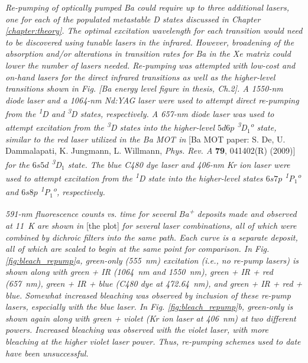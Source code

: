 \documentclass{article}
\begin{document}

\emph{Re-pumping of optically pumped Ba could require up to three additional lasers, one for each of the populated metastable D states discussed in Chapter \ref{chapter:theory}.  The optimal excitation wavelength for each transition would need to be discovered using tunable lasers in the infrared.  However, broadening of the absorption and/or alterations in transition rates for Ba in the Xe matrix could lower the number of lasers needed.  Re-pumping was attempted with low-cost and on-hand lasers for the direct infrared transitions as well as the higher-level transitions shown in Fig. [Ba energy level figure in thesis, Ch.2].  A 1550-nm diode laser and a 1064-nm Nd:YAG laser were used to attempt direct re-pumping from the \textsuperscript{1}D and \textsuperscript{3}D states, respectively.  A 657-nm diode laser was used to attempt excitation from the \textsuperscript{3}D states into the higher-level $5d6p$ \textsuperscript{3}D$_{1}$\textsuperscript{o} state, similar to the red laser utilized in the Ba MOT in} [Ba MOT paper: S. De, U. Dammalapati, K. Jungmann, L. Willmann, \emph{Phys. Rev. A} \textbf{79}, 041402(R) (2009)] \emph{for the $6s5d$ \textsuperscript{3}D$_{1}$ state.  The blue C480 dye laser and 406-nm Kr ion laser were used to attempt excitation from the \textsuperscript{1}D state into the higher-level states $6s7p$ \textsuperscript{1}P$_{1}$\textsuperscript{o} and $6s8p$ \textsuperscript{1}P$_{1}$\textsuperscript{o}, respectively.}

\emph{591-nm fluorescence counts vs. time for several Ba\textsuperscript{+} deposits made and observed at 11~K are shown in} [the plot] \emph{for several laser combinations, all of which were combined by dichroic filters into the same path.  Each curve is a separate deposit, all of which are scaled to begin at the same point for comparison.  In Fig. \ref{fig:bleach_repump}a, green-only (555~nm) excitation (i.e., no re-pump lasers) is shown along with green + IR (1064~nm and 1550~nm), green + IR + red (657~nm), green + IR + blue (C480 dye at 472.64~nm), and green + IR + red + blue.  Somewhat increased bleaching was observed by inclusion of these re-pump lasers, especially with the blue laser.  In Fig. \ref{fig:bleach_repump}b, green-only is shown again along with green + violet (Kr ion laser at 406~nm) at two different powers.  Increased bleaching was observed with the violet laser, with more bleaching at the higher violet laser power.  Thus, re-pumping schemes used to date have been unsuccessful.}
\end{document}
